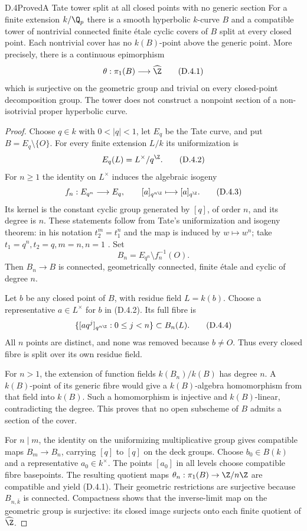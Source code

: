\begin{statement}{D.4}{Proved}{A Tate tower split at all closed points with no generic section}
For a finite extension $k/\Q_p$ there is a smooth hyperbolic
$k$-curve $B$ and a compatible tower of nontrivial connected
finite \'etale cyclic covers of $B$ split at every closed point.
Each nontrivial cover has no $k(B)$-point above the generic
point. More precisely, there is a continuous epimorphism
\[
 \theta:\pi_1(B)\longrightarrow\widehat\Z
 \tag{D.4.1}
\]
which is surjective on the geometric group and trivial on every
closed-point decomposition group. The tower does not construct
a nonpoint section of a non-isotrivial proper hyperbolic curve.
\end{statement}
\begin{proof}
Choose $q\in k$ with $0<|q|<1$, let $E_q$ be the Tate curve,
and put $B=E_q\setminus\{O\}$. For every finite extension
$L/k$ its uniformization is
\[
 E_q(L)=L^\times/q^{\Z}.
 \tag{D.4.2}
\]
For $n\ge1$ the identity on $L^\times$ induces the algebraic
isogeny
\[
 f_n:E_{q^n}\longrightarrow E_q,
 \qquad [a]_{q^{n\Z}}\longmapsto[a]_{q^\Z}.
 \tag{D.4.3}
\]
Its kernel is the constant cyclic group generated by $[q]$,
of order $n$, and its degree is $n$. These statements follow
from Tate's uniformization and isogeny theorem: in his notation
$t_2^m=t_1^n$ and the map is induced by $w\mapsto w^n$;
take $t_1=q^n,t_2=q,m=n,n=1$
\cite[Theorem 1 and the isogeny theorem on printed p.\ 16]{AgentTateUniformization}.
Set
\[
 B_n=E_{q^n}\setminus f_n^{-1}(O).
\]
Then $B_n\to B$ is connected, geometrically connected,
finite \'etale and cyclic of degree $n$.

Let $b$ be any closed point of $B$, with residue field
$L=k(b)$. Choose a representative $a\in L^\times$ for $b$
in (D.4.2). Its full fibre is
\[
 \{[a q^j]_{q^{n\Z}}:0\le j<n\}\subset B_n(L).
 \tag{D.4.4}
\]
All $n$ points are distinct, and none was removed because
$b\ne O$. Thus every closed fibre is split over its own
residue field.

For $n>1$, the extension of function fields
$k(B_n)/k(B)$ has degree $n$. A $k(B)$-point of its generic
fibre would give a $k(B)$-algebra homomorphism from that
field into $k(B)$. Such a homomorphism is injective and
$k(B)$-linear, contradicting the degree. This proves that
no open subscheme of $B$ admits a section of the cover.

For $n\mid m$, the identity on the uniformizing multiplicative
group gives compatible maps $B_m\to B_n$, carrying $[q]$
to $[q]$ on the deck groups. Choose $b_0\in B(k)$ and a
representative $a_0\in k^\times$. The points $[a_0]$ in all
levels choose compatible fibre basepoints. The resulting
quotient maps
$\theta_n:\pi_1(B)\to\Z/n\Z$ are compatible and yield
(D.4.1). Their geometric restrictions are surjective because
$B_{n,\bar k}$ is connected. Compactness shows that the
inverse-limit map on the geometric group is surjective: its
closed image surjects onto each finite quotient of
$\widehat\Z$.


\end{proof}
